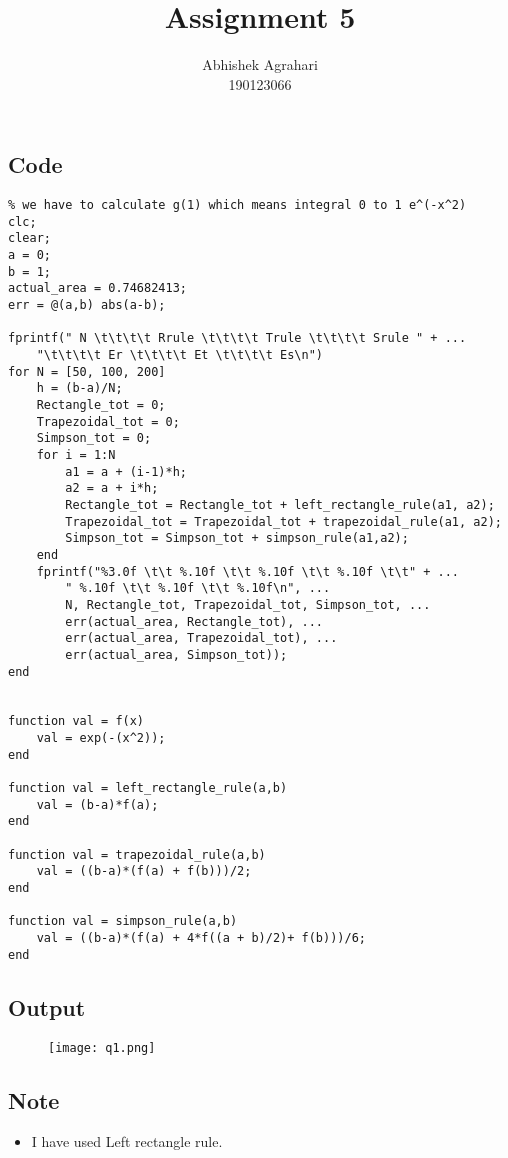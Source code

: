 \documentclass[12pt]{article}
\title{Assignment 5}
\author{Abhishek Agrahari\\190123066}
\date{}
\begin{document}
\maketitle

\section{} 
\subsection{Code}
\begin{verbatim}
% we have to calculate g(1) which means integral 0 to 1 e^(-x^2)
clc;
clear;
a = 0;
b = 1;
actual_area = 0.74682413;
err = @(a,b) abs(a-b);

fprintf(" N \t\t\t\t Rrule \t\t\t\t Trule \t\t\t\t Srule " + ...
    "\t\t\t\t Er \t\t\t\t Et \t\t\t\t Es\n")
for N = [50, 100, 200]
    h = (b-a)/N;
    Rectangle_tot = 0;
    Trapezoidal_tot = 0;
    Simpson_tot = 0;
    for i = 1:N
        a1 = a + (i-1)*h;
        a2 = a + i*h;
        Rectangle_tot = Rectangle_tot + left_rectangle_rule(a1, a2);
        Trapezoidal_tot = Trapezoidal_tot + trapezoidal_rule(a1, a2);
        Simpson_tot = Simpson_tot + simpson_rule(a1,a2);
    end
    fprintf("%3.0f \t\t %.10f \t\t %.10f \t\t %.10f \t\t" + ...
        " %.10f \t\t %.10f \t\t %.10f\n", ...
        N, Rectangle_tot, Trapezoidal_tot, Simpson_tot, ...
        err(actual_area, Rectangle_tot), ...
        err(actual_area, Trapezoidal_tot), ...
        err(actual_area, Simpson_tot));
end


function val = f(x)
    val = exp(-(x^2));
end

function val = left_rectangle_rule(a,b)
    val = (b-a)*f(a);
end

function val = trapezoidal_rule(a,b)
    val = ((b-a)*(f(a) + f(b)))/2;
end

function val = simpson_rule(a,b)
    val = ((b-a)*(f(a) + 4*f((a + b)/2)+ f(b)))/6;
end
\end{verbatim}

\subsection{Output}
\begin{figure}[H]
\centering
\texttt{[image: q1.png]}
\end{figure}

\subsection{Note}
\begin{itemize}
\item I have used Left rectangle rule.
\end{itemize}
\end{document}
